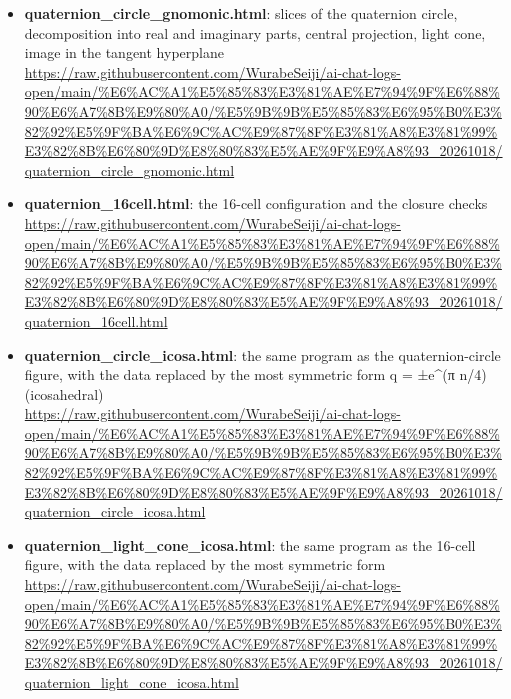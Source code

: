 \documentclass[
  a4paper,
]{article}
\providecommand{\tightlist}{%
  \setlength{\itemsep}{0pt}\setlength{\parskip}{0pt}}
\begin{document}
\begin{itemize}
\tightlist
\item
  \textbf{quaternion\_circle\_gnomonic.html}: slices of the quaternion
  circle, decomposition into real and imaginary parts, central
  projection, light cone, image in the tangent hyperplane\\
  \url{https://raw.githubusercontent.com/WurabeSeiji/ai-chat-logs-open/main/\%E6\%AC\%A1\%E5\%85\%83\%E3\%81\%AE\%E7\%94\%9F\%E6\%88\%90\%E6\%A7\%8B\%E9\%80\%A0/\%E5\%9B\%9B\%E5\%85\%83\%E6\%95\%B0\%E3\%82\%92\%E5\%9F\%BA\%E6\%9C\%AC\%E9\%87\%8F\%E3\%81\%A8\%E3\%81\%99\%E3\%82\%8B\%E6\%80\%9D\%E8\%80\%83\%E5\%AE\%9F\%E9\%A8\%93\_20261018/quaternion\_circle\_gnomonic.html}
\item
  \textbf{quaternion\_16cell.html}: the 16-cell configuration and the
  closure checks\\
  \url{https://raw.githubusercontent.com/WurabeSeiji/ai-chat-logs-open/main/\%E6\%AC\%A1\%E5\%85\%83\%E3\%81\%AE\%E7\%94\%9F\%E6\%88\%90\%E6\%A7\%8B\%E9\%80\%A0/\%E5\%9B\%9B\%E5\%85\%83\%E6\%95\%B0\%E3\%82\%92\%E5\%9F\%BA\%E6\%9C\%AC\%E9\%87\%8F\%E3\%81\%A8\%E3\%81\%99\%E3\%82\%8B\%E6\%80\%9D\%E8\%80\%83\%E5\%AE\%9F\%E9\%A8\%93\_20261018/quaternion\_16cell.html}
\item
  \textbf{quaternion\_circle\_icosa.html}: the same program as the
  quaternion-circle figure, with the data replaced by the most symmetric
  form q = ±e\^{}(π n/4) (icosahedral)\\
  \url{https://raw.githubusercontent.com/WurabeSeiji/ai-chat-logs-open/main/\%E6\%AC\%A1\%E5\%85\%83\%E3\%81\%AE\%E7\%94\%9F\%E6\%88\%90\%E6\%A7\%8B\%E9\%80\%A0/\%E5\%9B\%9B\%E5\%85\%83\%E6\%95\%B0\%E3\%82\%92\%E5\%9F\%BA\%E6\%9C\%AC\%E9\%87\%8F\%E3\%81\%A8\%E3\%81\%99\%E3\%82\%8B\%E6\%80\%9D\%E8\%80\%83\%E5\%AE\%9F\%E9\%A8\%93\_20261018/quaternion\_circle\_icosa.html}
\item
  \textbf{quaternion\_light\_cone\_icosa.html}: the same program as the
  16-cell figure, with the data replaced by the most symmetric form\\
  \url{https://raw.githubusercontent.com/WurabeSeiji/ai-chat-logs-open/main/\%E6\%AC\%A1\%E5\%85\%83\%E3\%81\%AE\%E7\%94\%9F\%E6\%88\%90\%E6\%A7\%8B\%E9\%80\%A0/\%E5\%9B\%9B\%E5\%85\%83\%E6\%95\%B0\%E3\%82\%92\%E5\%9F\%BA\%E6\%9C\%AC\%E9\%87\%8F\%E3\%81\%A8\%E3\%81\%99\%E3\%82\%8B\%E6\%80\%9D\%E8\%80\%83\%E5\%AE\%9F\%E9\%A8\%93\_20261018/quaternion\_light\_cone\_icosa.html}
\end{itemize}
\end{document}
